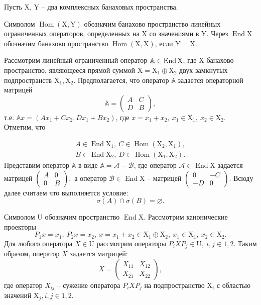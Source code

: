 Пусть $\mathrm{X}$, $\mathrm{Y}$ -- два комплексных банаховых пространства.

Символом $\operatorname{Hom}(\mathrm{X}, \mathrm{Y})$ обозначим банахово пространство линейных ограниченных операторов, определенных на $\mathrm{X}$ со значениями в $\mathrm{Y}$. Через $\operatorname{End}\mathrm{X}$ обозначим банахово пространство $\operatorname{Hom}(\mathrm{X}, \mathrm{X})$, 
если $\mathrm{Y} = \mathrm{X}$.

Рассмотрим линейный ограниченный оператор $\mathbb{A} \in \operatorname{End}\mathrm{X}$,
где $\mathrm{X}$ банахово пространство, являющееся прямой суммой 
$\mathrm{X} = \mathrm{X}_1 \oplus \mathrm{X}_2$ двух замкнутых подпространств
$\mathrm{X}_1, \mathrm{X}_2$. Предполагается, что оператор $\mathbb{A}$ задается операторной матрицей
$$
\mathbb{A} = \begin{pmatrix}
		A & C \\
		D & B
	\end{pmatrix},
$$
т.е. $\mathbb{A}x = (A x_1 + C x_2, D x_1 + B x_2)$, где $x = x_1 + x_2, \ x_1 \in \mathrm{X}_1, \ x_2 \in \mathrm{X}_2$. Отметим, что

\begin{align*}
A \in \operatorname{End}\mathrm{X}_1, \ C \in \operatorname{Hom}(\mathrm{X}_2, \mathrm{X}_1), \\
B \in \operatorname{End}\mathrm{X}_2, \ D \in \operatorname{Hom}(\mathrm{X}_1, \mathrm{X}_2).
\end{align*}
Представим оператор $\mathbb{A}$ в виде $\mathbb{A} = \mathcal{A} - \mathcal{B}$, где оператор 
$\mathcal{A} \in \operatorname{End}\mathrm{X}$ задается матрицей 
$\begin{pmatrix}
		A & 0 \\
		0 & B
\end{pmatrix}, $ а оператор $\mathcal{B} \in \operatorname{End}\mathrm{X}$ -- матрицей
$\begin{pmatrix}
		0 & -C \\
		-D & 0
\end{pmatrix}.$
Всюду далее считаем что выполняется условие:
$$
\sigma(A) \cap \sigma(B) = {\varnothing}.
$$

Символом $\mathrm{U}$ обозначим пространство $\operatorname{End}\mathrm{X}$. Рассмотрим канонические проекторы
$$
P_1x = x_1, \ P_2x = x_2, \ x = x_1 + x_2 \in \mathrm{X}_1 \oplus \mathrm{X}_2, 
\ x_1 \in \mathrm{X}_1, \ x_2 \in \mathrm{X}_2.
$$
Для любого оператора $X \in \mathrm{U}$ рассмотрим операторы $P_i X P_j \in \mathrm{U}, \ i,j \in {1,2}.$ Таким образом, оператор $X$ задается матрицей:
$$
X = \begin{pmatrix}
		X_{11} & X_{12} \\
		X_{21} & X_{22}
	\end{pmatrix},
$$
где оператор $X_{ij}$ -- сужение оператора $P_iXP_j$ на подпространство $\mathrm{X}_i$ с областью значений $\mathrm{X}_j, i,j \in {1,2}.$

